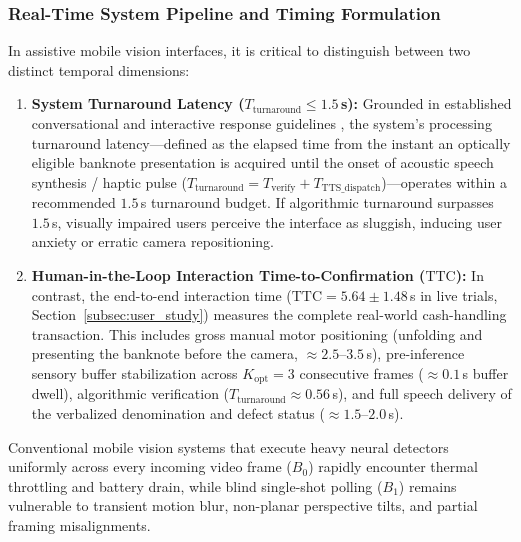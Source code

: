 \documentclass[final,5p,times,twocolumn,authoryear]{elsarticle}
\begin{document}
\subsubsection{Real-Time System Pipeline and Timing Formulation}
\label{subsubsec:timing_budget}
In assistive mobile vision interfaces, it is critical to distinguish between two distinct temporal dimensions:
\begin{enumerate}[label=(\alph*)]
    \item \textbf{System Turnaround Latency ($T_{\text{turnaround}} \le 1.5$\,s):} Grounded in established conversational and interactive response guidelines \cite{Nielsen1993,Miller1968}, the system's processing turnaround latency---defined as the elapsed time from the instant an optically eligible banknote presentation is acquired until the onset of acoustic speech synthesis / haptic pulse ($T_{\text{turnaround}} = T_{\text{verify}} + T_{\text{TTS\_dispatch}}$)---operates within a recommended $1.5$\,s turnaround budget. If algorithmic turnaround surpasses $1.5$\,s, visually impaired users perceive the interface as sluggish, inducing user anxiety or erratic camera repositioning.
    \item \textbf{Human-in-the-Loop Interaction Time-to-Confirmation ($\text{TTC}$):} In contrast, the end-to-end interaction time ($\text{TTC} = 5.64 \pm 1.48$\,s in live trials, Section~\ref{subsec:user_study}) measures the complete real-world cash-handling transaction. This includes gross manual motor positioning (unfolding and presenting the banknote before the camera, $\approx 2.5$--$3.5$\,s), pre-inference sensory buffer stabilization across $K_{\text{opt}} = 3$ consecutive frames ($\approx 0.1$\,s buffer dwell), algorithmic verification ($T_{\text{turnaround}} \approx 0.56$\,s), and full speech delivery of the verbalized denomination and defect status ($\approx 1.5$--$2.0$\,s).
\end{enumerate}

Conventional mobile vision systems that execute heavy neural detectors uniformly across every incoming video frame ($B_0$) rapidly encounter thermal throttling and battery drain, while blind single-shot polling ($B_1$) remains vulnerable to transient motion blur, non-planar perspective tilts, and partial framing misalignments.
\end{document}
